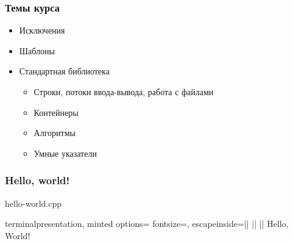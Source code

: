 \documentclass[compress]{beamer}
\begin{document}
\begin{frame}

    \frametitle{Темы курса}

    \begin{itemize}

        \item Исключения

        \item Шаблоны

        \item Стандартная библиотека

            \begin{itemize}

                \item Строки, потоки ввода-вывода, работа с файлами

                \item Контейнеры

                \item Алгоритмы

                \item Умные указатели

            \end{itemize}

    \end{itemize}

\end{frame}

\begin{frame}[fragile]

    \frametitle{Hello, world!}

        {hello-world.cpp}

    \begin{terminalwindow}{%
        terminalpresentation,
        minted options={
            fontsize=\footnotesize,
            escapeinside=||
        }
    }
||
||
Hello, World!
    \end{terminalwindow}

\end{frame}
\end{document}
